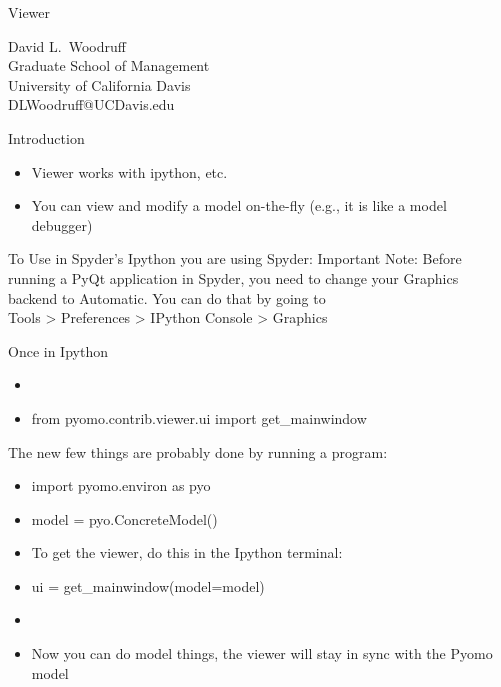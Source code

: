 \documentclass{beamer}
\begin{document}
\begin{frame}{}

\begin{center}
\begin{Large}
Viewer 
\end{Large}
$\mbox{ }$\\
David L.\ Woodruff\\
Graduate School of Management\\
University of California Davis\\
DLWoodruff@UCDavis.edu\\
\end{center}
\end{frame}

\begin{frame}{Introduction}
  \begin{itemize}
  \item Viewer works with ipython, etc.
  \item You can view and modify a model on-the-fly (e.g., it is like a model debugger)
  \end{itemize}
\end{frame}

\begin{frame}{To Use in Spyder's Ipython}
  \If you are using Spyder: Important Note: Before running a PyQt application in Spyder, you need to change your Graphics backend to Automatic. You can do that by going to
\\
Tools > Preferences > IPython Console > Graphics
\end{frame}

\begin{frame}{Once in Ipython}
\subtitle{From the Viewer readme}

\begin{itemize}
\item %
\item from pyomo.contrib.viewer.ui import get\_mainwindow
\end{itemize}

The new few things are probably done by running a program:
\begin{itemize}
\item import pyomo.environ as pyo
\item model = pyo.ConcreteModel()
\end{itemize}

\begin{itemize}
\item[] To get the viewer, do this in the Ipython terminal:
\item[] ui = get\_mainwindow(model=model)
\item[]
\item []Now you can do model things, the viewer will stay in sync with the Pyomo model
\end{itemize}
\end{frame}
\end{document}
